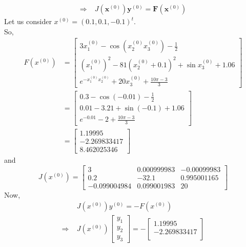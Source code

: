 \documentclass[../main-sheet.tex]{subfiles}
\begin{document}
\begin{ex}
\begin{align*}
        \Rightarrow\; &J\left( \mathbf{x}^{(0)} \right)\mathbf{y}^{(0)}=\mathbf{F}\left( \mathbf{x}^{(0)} \right)
    \end{align*}
    Let us consider \({x}^{(0)}=(0.1,0.1,-0.1)^t\).\\So,
    \begin{align*}
        {F}({x}^{(0)})&
        {=\begin{bmatrix*}
            3x_1^{(0)}-\cos(x_2^{(0)}x_3^{(0)})-\frac{1}{2}\\[1em]
            \left(x_1^{(0)}\right)^2-81(x_2^{(0)}+0.1)^2+\sin x_3^{(0)}+1.06\\[1em]
            e^{-x_1^{(0)}x_2^{(0)}}+20x_3^{(0)}+\frac{10\pi -3}{3}
        \end{bmatrix*}}\\
        &={\begin{bmatrix*}
            0.3-\cos(-0.01)-\frac{1}{2}\\[1em]
            0.01-3.21+\sin (-0.1)+1.06\\[1em]
            e^{-0.01}-2+\frac{10\pi -3}{3}
        \end{bmatrix*}}\\
        &={\begin{bmatrix*}
            1.19995\\[1em]
            -2.269833417\\[1em]
            8.462025346
        \end{bmatrix*}}
    \end{align*}
    and
    \[
        J(x^(0))={\begin{bmatrix*}
            3& 0.000999983 & -0.00099983\\
            0.2& -32.1 & 0.995001165\\
            -0.099004984& 0.099001983 & 20
        \end{bmatrix*}}
    \]
    Now,
    \begin{align*}
        & J\left( x^{(0)} \right)y^{(0)}=-F\left( x^{(0)} \right)\\
        \Rightarrow\; & J\left( x^{(0)} \right){\begin{bmatrix}
            y_1\\
            y_2\\
            y_3
        \end{bmatrix}}=-{\begin{bmatrix*}
            1.19995\\[1em]
            -2.269833417\\[1em]

\end{bmatrix*}}
\end{align*}
\end{ex}
\end{document}
